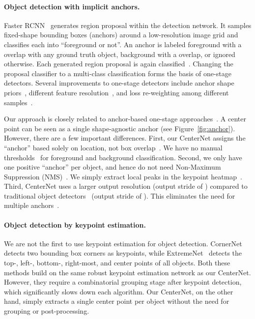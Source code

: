 \documentclass[10pt,twocolumn,letterpaper]{article}
\begin{document}
\paragraph{Object detection with implicit anchors.}
 
Faster RCNN~\cite{ren2015faster} generates region proposal within the detection network. 
It samples fixed-shape bounding boxes (anchors) around a low-resolution image grid and classifies each into ``foreground or not''.
An anchor is labeled foreground with a  overlap with any ground truth object, background with a  overlap, or ignored otherwise.
Each generated region proposal is again classified~\cite{girshick2015fast}.
Changing the proposal classifier to a multi-class classification forms the basis of one-stage detectors.
Several improvements to one-stage detectors include anchor shape priors~\cite{redmon2017yolo9000,redmon2018yolov3}, different feature resolution~\cite{liu2016ssd}, and loss re-weighting among different samples~\cite{lin2018focal}.

Our approach is closely related to anchor-based one-stage approaches~\cite{redmon2016you,liu2016ssd,lin2018focal}.
A center point can be seen as a single shape-agnostic anchor (see Figure~\ref{fig:anchor}).
However, there are a few important differences.
First, our CenterNet assigns the ``anchor'' based solely on location, not box overlap~\cite{girshick2015fast}.
We have no manual thresholds~\cite{girshick2015fast} for foreground and background classification.
Second, we only have one positive ``anchor'' per object, and hence do not need Non-Maximum Suppression (NMS)~\cite{bodla2017soft}.
We simply extract local peaks in the keypoint heatmap~\cite{newell2017associative,cao2017realtime}.
Third, CenterNet uses a larger output resolution (output stride of ) compared to traditional object detectors~\cite{he2016deep,he2017mask} (output stride of ).
This eliminates the need for multiple anchors~\cite{singh2018analysis}.

\paragraph{Object detection by keypoint estimation.}
We are not the first to use keypoint estimation for object detection.
CornerNet~\cite{Law_2018_ECCV} detects two bounding box corners as keypoints, while ExtremeNet~\cite{zhou2019bottomup} detects the top-, left-, bottom-, right-most, and center points of all objects.
Both these methods build on the same robust keypoint estimation network as our CenterNet.
However, they require a combinatorial grouping stage after keypoint detection, which significantly slows down each algorithm.
Our CenterNet, on the other hand, simply extracts a single center point per object without the need for grouping or post-processing.
\end{document}
